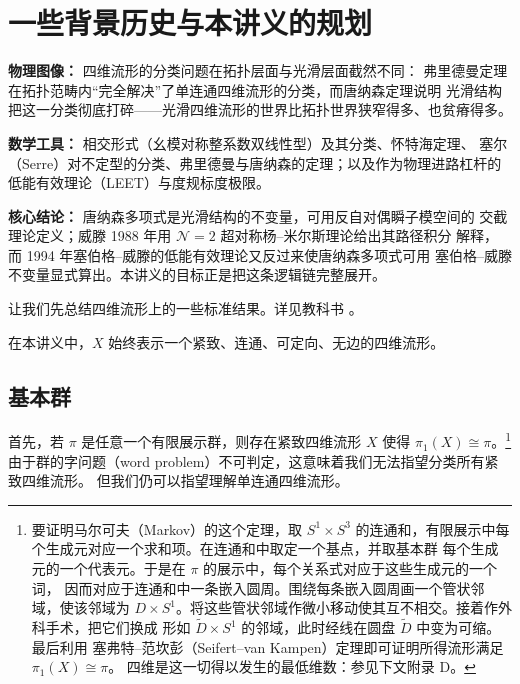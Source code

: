 
\section{一些背景历史与本讲义的规划}

\begin{keytakeaways}
\item \textbf{物理图像：} 四维流形的分类问题在拓扑层面与光滑层面截然不同：
      弗里德曼定理在拓扑范畴内“完全解决”了单连通四维流形的分类，而唐纳森定理说明
      光滑结构把这一分类彻底打碎——光滑四维流形的世界比拓扑世界狭窄得多、也贫瘠得多。
\item \textbf{数学工具：} 相交形式（幺模对称整系数双线性型）及其分类、怀特海定理、
      塞尔（Serre）对不定型的分类、弗里德曼与唐纳森的定理；以及作为物理进路杠杆的
      低能有效理论（LEET）与度规标度极限。
\item \textbf{核心结论：} 唐纳森多项式是光滑结构的不变量，可用反自对偶瞬子模空间的
      交截理论定义；威滕 1988 年用 $\mathcal{N}=2$ 超对称杨--米尔斯理论给出其路径积分
      解释，而 1994 年塞伯格--威滕的低能有效理论又反过来使唐纳森多项式可用
      塞伯格--威滕不变量显式算出。本讲义的目标正是把这条逻辑链完整展开。
\end{keytakeaways}

让我们先总结四维流形上的一些标准结果。详见教科书 \cite{ref8,ref16,ref17,ref48}。

在本讲义中，$X$ 始终表示一个紧致、连通、可定向、无边的四维流形。

\subsection{基本群}

首先，若 $\pi$ 是任意一个有限展示群，则存在紧致四维流形 $X$ 使得
$\pi_{1}(X)\cong\pi$。\footnote{要证明马尔可夫（Markov）的这个定理，取 $S^{1}\times S^{3}$
的连通和，有限展示中每个生成元对应一个求和项。在连通和中取定一个基点，并取基本群
每个生成元的一个代表元。于是在 $\pi$ 的展示中，每个关系式对应于这些生成元的一个词，
因而对应于连通和中一条嵌入圆周。围绕每条嵌入圆周画一个管状邻域，使该邻域为
$D\times S^{1}$。将这些管状邻域作微小移动使其互不相交。接着作外科手术，把它们换成
形如 $\tilde{D}\times S^{1}$ 的邻域，此时经线在圆盘 $\tilde{D}$ 中变为可缩。最后利用
塞弗特--范坎彭（Seifert--van Kampen）定理即可证明所得流形满足 $\pi_{1}(X)\cong\pi$。
四维是这一切得以发生的最低维数：参见下文附录 D。}
由于群的字问题（word problem）不可判定，这意味着我们无法指望分类所有紧致四维流形。
但我们仍可以指望理解单连通四维流形。

